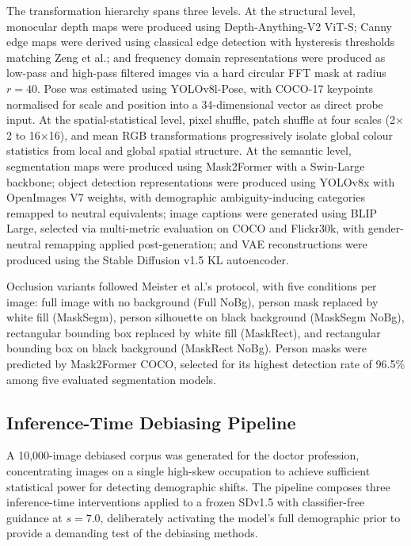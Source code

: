The transformation hierarchy spans three levels. At the structural level, monocular
depth maps were produced using Depth-Anything-V2 ViT-S; Canny edge maps were derived
using classical edge detection with hysteresis thresholds matching Zeng et al.; and
frequency domain representations were produced as low-pass and high-pass filtered
images via a hard circular FFT mask at radius $r=40$. Pose was estimated using
YOLOv8l-Pose, with COCO-17 keypoints normalised for scale and position into a
34-dimensional vector as direct probe input. At the spatial-statistical level, pixel
shuffle, patch shuffle at four scales (2$\times$2 to 16$\times$16), and mean RGB
transformations progressively isolate global colour statistics from local and global
spatial structure. At the semantic level, segmentation maps were produced using
Mask2Former with a Swin-Large backbone; object detection representations were produced
using YOLOv8x with OpenImages V7 weights, with demographic ambiguity-inducing categories
remapped to neutral equivalents; image captions were generated using BLIP Large,
selected via multi-metric evaluation on COCO and Flickr30k, with gender-neutral
remapping applied post-generation; and VAE reconstructions were produced using the
Stable Diffusion v1.5 KL autoencoder.

Occlusion variants followed Meister et al.'s protocol, with five conditions per image:
full image with no background (Full NoBg), person mask replaced by white fill
(MaskSegm), person silhouette on black background (MaskSegm NoBg), rectangular bounding
box replaced by white fill (MaskRect), and rectangular bounding box on black background
(MaskRect NoBg). Person masks were predicted by Mask2Former COCO, selected for its
highest detection rate of 96.5\% among five evaluated segmentation models.

\subsection{Inference-Time Debiasing Pipeline}

A 10,000-image debiased corpus was generated for the doctor profession, concentrating
images on a single high-skew occupation to achieve sufficient statistical power for
detecting demographic shifts. The pipeline composes three inference-time interventions
applied to a frozen SDv1.5 with classifier-free guidance at $s=7.0$, deliberately
activating the model's full demographic prior to provide a demanding test of the
debiasing methods.

